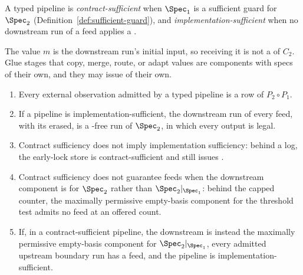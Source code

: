 \begin{definition}
\label{def:sufficient-pipeline}
A typed pipeline is \emph{contract-sufficient} when $\Spec_1$ is a sufficient
guard for $\Spec_2$ (Definition~\ref{def:sufficient-guard}), and
\emph{implementation-sufficient} when no downstream run of a feed applies a
\commitment.
\end{definition}

The value $m$ is the downstream run's initial input, so receiving it is not
a \commitment of $C_2$.  Glue stages that copy, merge, route, or adapt values
are components with specs of their own, and they may issue \commitments of
their own.

\begin{proposition}
\label{prop:typed-pipelines}
\leavevmode
\begin{enumerate}
\item Every external observation admitted by a typed pipeline is a row of
      $P_2\circ P_1$.
\item If a pipeline is implementation-sufficient, the downstream run of every
      feed, with its \commitments erased, is a \commitment-free run of
      $\Spec_2$, in which every output is legal.
\item Contract sufficiency does not imply implementation sufficiency: behind a
      log, the early-lock store is contract-sufficient and still issues
      \commitments.
\item Contract sufficiency does not guarantee feeds when the downstream
      component is for $\Spec_2$ rather than $\Spec_2|_{\Spec_1}$: behind the
      capped counter, the maximally permissive empty-basis component for the
      threshold test admits no feed at an offered count.
\item If, in a contract-sufficient pipeline, the downstream is instead the
      maximally permissive empty-basis component for $\Spec_2|_{\Spec_1}$,
      every admitted upstream boundary run has a feed, and the pipeline is
      implementation-sufficient.
\end{enumerate}
\end{proposition}

